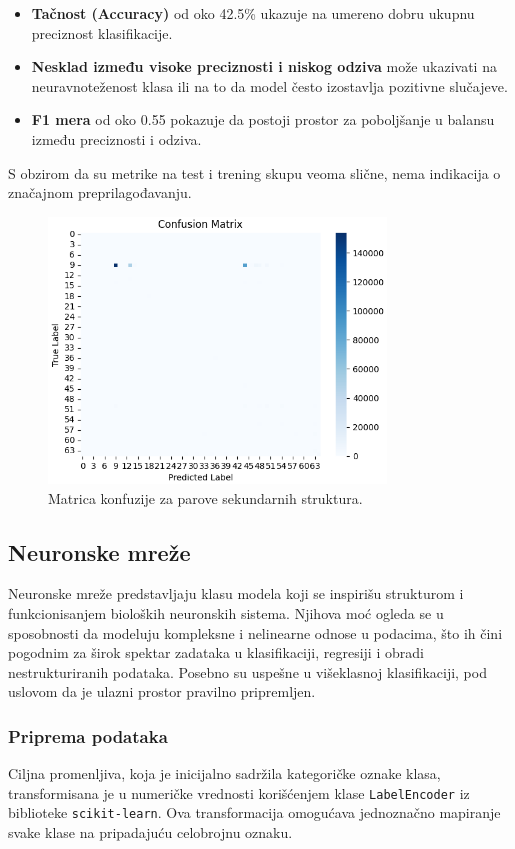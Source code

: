 \documentclass[a4paper,12pt]{article}
\begin{document}
\begin{itemize}
    \item \textbf{Tačnost (Accuracy)} od oko 42.5\% ukazuje na umereno dobru ukupnu preciznost klasifikacije.
    \item \textbf{Nesklad između visoke preciznosti i niskog odziva} može ukazivati na neuravnoteženost klasa ili na to da model često izostavlja pozitivne slučajeve.
    \item \textbf{F1 mera} od oko 0.55 pokazuje da postoji prostor za poboljšanje u balansu između preciznosti i odziva.
\end{itemize}
S obzirom da su metrike na test i trening skupu veoma slične, nema indikacija o značajnom preprilagođavanju.

\begin{figure}[htbp]
    \centering
    \includegraphics[width=0.8\textwidth]{./images/conf_mat_ss.png}
    \caption{Matrica konfuzije za parove sekundarnih struktura.}
    \label{Slika:confmatss}
\end{figure}

\subsection{Neuronske mreže}

Neuronske mreže predstavljaju klasu modela koji se inspirišu strukturom i funkcionisanjem bioloških neuronskih sistema. Njihova moć ogleda se u sposobnosti da modeluju kompleksne i nelinearne odnose u podacima, što ih čini pogodnim za širok spektar zadataka u klasifikaciji, regresiji i obradi nestrukturiranih podataka. Posebno su uspešne u višeklasnoj klasifikaciji, pod uslovom da je ulazni prostor pravilno pripremljen.

\subsubsection*{Priprema podataka}
Ciljna promenljiva, koja je inicijalno sadržila kategoričke oznake klasa, transformisana je u numeričke vrednosti korišćenjem klase \texttt{LabelEncoder} iz biblioteke \texttt{scikit-learn}. Ova transformacija omogućava jednoznačno mapiranje svake klase na pripadajuću celobrojnu oznaku.
\end{document}
